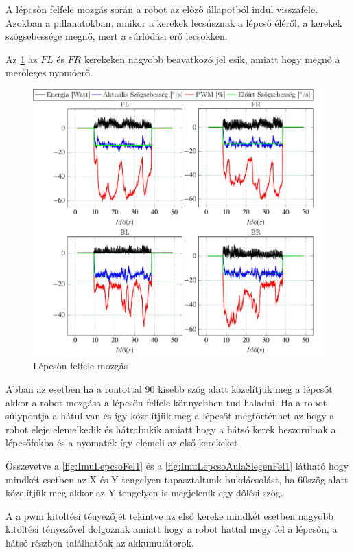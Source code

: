 A lépcsőn felfele mozgás során a robot az előző állapotból indul visszafele. Azokban a pillanatokban, amikor a kerekek lecsúsznak a lépcső éléről, a kerekek szögsebessége megnő, mert a súrlódási erő lecsökken.  

Az \ref{fig:LepcsoFelxx} az $FL$ és $FR$ kerekeken nagyobb beavatkozó jel esik, amiatt hogy megnő a merőleges nyomóerő.

\begin{figure}[H]
  \includegraphics{tikz/LepcsoFelxx.pdf}
  \caption{Lépcsőn felfele mozgás}
  \label{fig:LepcsoFelxx}
\end{figure}

Abban az esetben ha a rontottal 90 \degree kisebb szög alatt közelítjük meg a lépcsőt akkor a robot mozgása a lépcsőn felfele könnyebben tud haladni. Ha a robot súlypontja a hátul  van és így közelítjük meg a lépcsőt megtörténhet az hogy a robot eleje elemelkedik és hátrabukik amiatt hogy a hátsó kerek beszorulnak a lépcsőfokba és a nyomaték így elemeli az első kerekeket.

Összevetve a \ref{fig:ImuLepcsoFel1} és a \ref{fig:ImuLepcsoAulaSlegenFel1}
látható hogy mindkét esetben az X és Y tengelyen tapasztaltunk bukdácsolást, ha 60\degree szög alatt közelítjük meg akkor az Y tengelyen is megjelenik egy dőlési szög.

A a pwm kitöltési tényezőjét tekintve az első kereke mindkét esetben nagyobb kitöltési tényezővel dolgoznak amiatt hogy a robot hattal megy fel a lépcsőn, a hátsó részben találhatóak az akkumulátorok.

